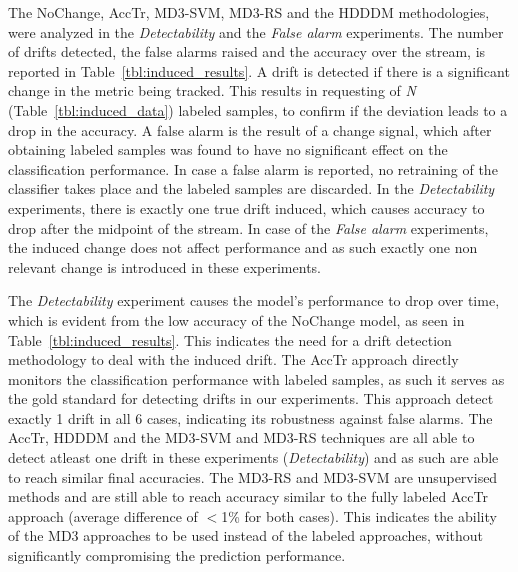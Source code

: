 \documentclass[authoryear,3p,times,twocolumn]{elsarticle}
\begin{document}
The NoChange, AccTr, MD3-SVM, MD3-RS and the HDDDM methodologies, were analyzed in the \textit{Detectability} and the \textit{False alarm} experiments. The number of drifts detected, the false alarms raised and the accuracy over the stream, is reported in Table~\ref{tbl:induced_results}. A drift is detected if there is a significant change in the metric being tracked. This results in requesting of \textit{N} (Table~\ref{tbl:induced_data}) labeled samples, to confirm if the deviation leads to a drop in the accuracy. A false alarm is the result of a change signal, which after obtaining labeled samples was found to have no significant effect on the classification performance. In case a false alarm is reported, no retraining of the classifier takes place and the labeled samples are discarded. In the \textit{Detectability} experiments, there is exactly one true drift induced, which causes accuracy to drop after the midpoint of the stream. In case of the \textit{False alarm} experiments, the induced change does not affect performance and as such exactly one non relevant change is introduced in these experiments. 

The \textit{Detectability} experiment causes the model's performance to drop over time, which is evident from the low accuracy of the NoChange model, as seen in Table~\ref{tbl:induced_results}. This indicates the need for a drift detection methodology to deal with the induced drift. The AccTr approach directly monitors the classification performance with labeled samples, as such it serves as the gold standard for detecting drifts in our experiments. This approach detect exactly 1 drift in all 6 cases, indicating its robustness against false alarms. The AccTr, HDDDM and the MD3-SVM and MD3-RS techniques are all able to detect atleast one drift in these experiments (\textit{Detectability}) and as such are able to reach similar final accuracies. The MD3-RS and MD3-SVM are unsupervised methods and are still able to reach accuracy similar to the fully labeled AccTr approach (average difference of $<$1\% for both cases). This indicates the ability of the MD3 approaches to be used instead of the labeled approaches, without significantly compromising the prediction performance.
\end{document}
